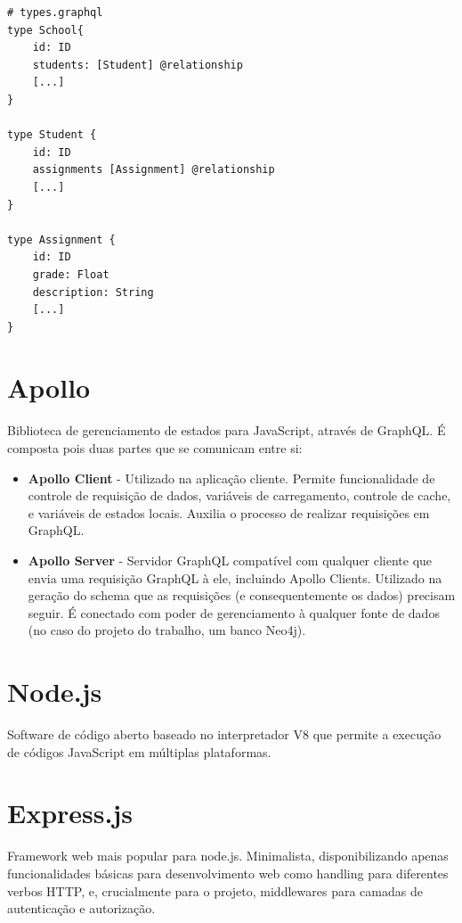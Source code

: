 \begin{lstlisting}
# types.graphql
type School{
    id: ID
    students: [Student]	@relationship
    [...]
}

type Student {
    id: ID
    assignments [Assignment] @relationship
    [...]
}

type Assignment {
    id: ID
    grade: Float
    description: String
    [...]
}
\end{lstlisting}


\section{Apollo}

Biblioteca de gerenciamento de estados para JavaScript, através de GraphQL. É composta pois duas partes que se comunicam entre si:
\begin{itemize}
    \item \textbf{Apollo Client} - Utilizado na aplicação cliente. Permite funcionalidade de controle de requisição de dados, variáveis de carregamento, controle de cache, e variáveis de estados locais. Auxilia o processo de realizar requisições em GraphQL.
    \item \textbf{Apollo Server} - Servidor GraphQL compatível com qualquer cliente que envia uma requisição GraphQL à ele, incluindo Apollo Clients. Utilizado na geração do schema que as requisições (e consequentemente os dados) precisam seguir. É conectado com poder de gerenciamento à qualquer fonte de dados (no caso do projeto do trabalho, um banco Neo4j).

\end{itemize}

\section{Node.js}

Software de código aberto baseado no interpretador V8 que permite a execução de códigos JavaScript em múltiplas plataformas.

\section{Express.js}

Framework web mais popular para node.js. Minimalista,  disponibilizando apenas funcionalidades básicas para desenvolvimento web como handling para diferentes verbos HTTP, e, crucialmente para o projeto, middlewares para camadas de autenticação e autorização.


